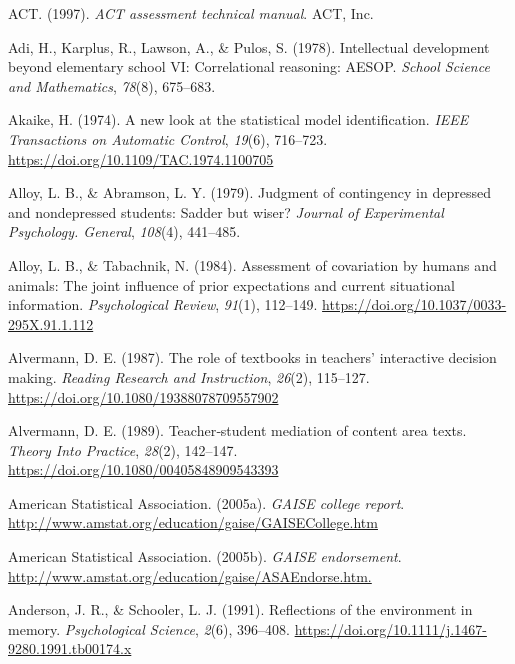 \documentclass[11pt]{umnthesis}
\newlength{\cslhangindent}
\newenvironment{CSLReferences}[2] %
 {%
  \setlength{\parindent}{0pt}
  \ifodd #1 \everypar{\setlength{\hangindent}{\cslhangindent}}\ignorespaces\fi
  \ifnum #2 > 0
  \setlength{\parskip}{#2\baselineskip}
  \fi
 }%
 {}
\begin{document}
\hypertarget{refs}{}
\begin{CSLReferences}{1}{0}
\leavevmode{}%
ACT. (1997). \emph{{ACT} assessment technical manual}. ACT, Inc.

\leavevmode{}%
Adi, H., Karplus, R., Lawson, A., \& Pulos, S. (1978). Intellectual development beyond elementary school VI: Correlational reasoning: AESOP. \emph{School Science and Mathematics}, \emph{78}(8), 675--683.

\leavevmode{}%
Akaike, H. (1974). A new look at the statistical model identification. \emph{IEEE Transactions on Automatic Control}, \emph{19}(6), 716--723. \url{https://doi.org/10.1109/TAC.1974.1100705}

\leavevmode{}%
Alloy, L. B., \& Abramson, L. Y. (1979). Judgment of contingency in depressed and nondepressed students: Sadder but wiser? \emph{Journal of Experimental Psychology. General}, \emph{108}(4), 441--485.

\leavevmode{}%
Alloy, L. B., \& Tabachnik, N. (1984). Assessment of covariation by humans and animals: The joint influence of prior expectations and current situational information. \emph{Psychological Review}, \emph{91}(1), 112--149. \url{https://doi.org/10.1037/0033-295X.91.1.112}

\leavevmode{}%
Alvermann, D. E. (1987). The role of textbooks in teachers' interactive decision making. \emph{Reading Research and Instruction}, \emph{26}(2), 115--127. \url{https://doi.org/10.1080/19388078709557902}

\leavevmode{}%
Alvermann, D. E. (1989). Teacher‐student mediation of content area texts. \emph{Theory Into Practice}, \emph{28}(2), 142--147. \url{https://doi.org/10.1080/00405848909543393}

\leavevmode{}%
American Statistical Association. (2005a). \emph{GAISE college report}. \url{http://www.amstat.org/education/gaise/GAISECollege.htm}

\leavevmode{}%
American Statistical Association. (2005b). \emph{{GAISE} endorsement}. \url{http://www.amstat.org/education/gaise/ASAEndorse.htm.}

\leavevmode{}%
Anderson, J. R., \& Schooler, L. J. (1991). Reflections of the environment in memory. \emph{Psychological Science}, \emph{2}(6), 396--408. \url{https://doi.org/10.1111/j.1467-9280.1991.tb00174.x}


\end{CSLReferences}
\end{document}
